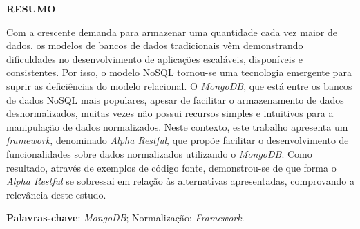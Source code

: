 \vfill
\begin{center}
{\textbf{RESUMO}\\}
\end{center}
\noindent

Com a crescente demanda para armazenar uma quantidade cada vez maior de dados, os modelos de bancos de dados tradicionais vêm demonstrando dificuldades no desenvolvimento de aplicações escaláveis, disponíveis e consistentes. Por isso, o modelo NoSQL tornou-se uma tecnologia emergente para suprir as deficiências do modelo relacional. O \textit{MongoDB}, que está entre os bancos de dados NoSQL mais populares, apesar de facilitar o armazenamento de dados desnormalizados, muitas vezes não possui recursos simples e intuitivos para a manipulação de dados normalizados. Neste contexto, este trabalho apresenta um \textit{framework}, denominado \textit{Alpha Restful}, que propõe facilitar o desenvolvimento de funcionalidades sobre dados normalizados utilizando o \textit{MongoDB}. Como resultado, através de exemplos de código fonte, demonstrou-se de que forma o \textit{Alpha Restful} se sobressai em relação às alternativas apresentadas, comprovando a relevância deste estudo.

\vspace{\onelineskip}
 \noindent
 \textbf{Palavras-chave}: \textit{MongoDB}; Normalização; \textit{Framework}.
